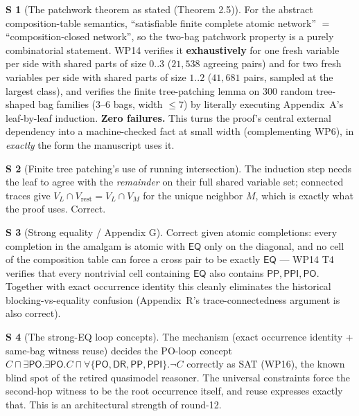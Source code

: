 \documentclass[11pt]{article}
\theoremstyle{definition}
\newtheorem{soundstep}{S}
\newcommand{\EQ}{\mathsf{EQ}}
\newcommand{\PP}{\mathsf{PP}}
\newcommand{\PPI}{\mathsf{PPI}}
\newcommand{\PO}{\mathsf{PO}}
\newcommand{\DR}{\mathsf{DR}}
\begin{document}
\begin{soundstep}[The patchwork theorem as stated (Theorem 2.5)]
For the abstract composition-table semantics, ``satisfiable finite complete
atomic network'' $=$ ``composition-closed network'', so the two-bag
patchwork property is a purely combinatorial statement.  WP14 verifies it
\textbf{exhaustively} for one fresh variable per side with shared parts of
size $0..3$ ($21{,}538$ agreeing pairs) and for two fresh variables per side
with shared parts of size $1..2$ ($41{,}681$ pairs, sampled at the largest
class), and verifies the finite tree-patching lemma on 300 random
tree-shaped bag families (3--6 bags, width $\le 7$) by literally executing
Appendix~A's leaf-by-leaf induction.  \textbf{Zero failures.}  This turns
the proof's central external dependency into a machine-checked fact at
small width (complementing WP6), in \emph{exactly} the form the manuscript
uses it.
\end{soundstep}

\begin{soundstep}[Finite tree patching's use of running intersection]
The induction step needs the leaf to agree with the \emph{remainder} on
their full shared variable set; connected traces give
$V_L\cap V_{\mathrm{rest}} = V_L\cap V_M$ for the unique neighbor $M$,
which is exactly what the proof uses.  Correct.
\end{soundstep}

\begin{soundstep}[Strong equality / Appendix G]
Correct given atomic completions: every completion in the amalgam is atomic
with $\EQ$ only on the diagonal, and no cell of the composition table can
force a cross pair to be exactly $\EQ$ --- WP14 T4 verifies that every
nontrivial cell containing $\EQ$ also contains $\PP,\PPI,\PO$.  Together
with exact occurrence identity this cleanly eliminates the historical
blocking-vs-equality confusion (Appendix~R's trace-connectedness argument
is also correct).
\end{soundstep}

\begin{soundstep}[The strong-EQ loop concepts]
The mechanism (exact occurrence identity + same-bag witness reuse) decides
the PO-loop concept
$C\sqcap\exists\PO.\exists\PO.C\sqcap\forall\{\PO,\DR,\PP,\PPI\}.\lnot C$
correctly as SAT (WP16), the known blind spot of the retired quasimodel
reasoner.  The universal constraints force the second-hop witness to be the
root occurrence itself, and reuse expresses exactly that.  This is an
architectural strength of round-12.
\end{soundstep}
\end{document}
